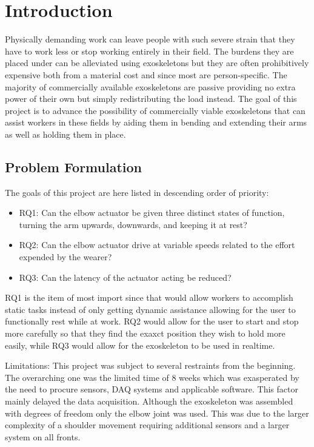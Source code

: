 \section{Introduction}
\label{section:intro}

Physically demanding work can leave people with such severe strain that they have to work less or stop working entirely in 
their field\cite{WorkDemands}. The burdens they are placed under can be alleviated using exoskeletons but they are often 
prohibitively expensive both from a material cost and since most are person-specific. The majority of commercially available 
exoskeletons are passive providing no extra power of their own but simply redistributing the load instead. The goal of this 
project is to advance the possibility of commercially viable exoskeletons that can assist workers in these fields by aiding 
them in bending and extending their arms as well as holding them in place.

\subsection{Problem Formulation}
The goals of this project are here listed in descending order of priority:
\begin{itemize}
        
    \item RQ1: Can the elbow actuator be given three distinct states of function, turning the arm upwards, downwards, and keeping it at rest?

    \item RQ2: Can the elbow actuator drive at variable speeds related to the effort expended by the wearer?

    \item RQ3: Can the latency of the actuator acting be reduced?

\end{itemize}
RQ1 is the item of most import since that would allow workers to accomplish static tasks instead of only getting dynamic assistance 
allowing for the user to functionally rest while at work. RQ2 would allow for the user to start and stop more carefully so that they 
find the exaxct position they wish to hold more easily, while RQ3 would allow for the exoskeleton to be used in realtime.

Limitations:
    This project was subject to several restraints from the beginning. The overarching one was the limited time of 8 weeks which was
    exasperated by the need to procure sensors, DAQ systems and applicable software. This factor mainly delayed the data acquisition. 
    Although the exoskeleton was assembled with degrees of freedom only the elbow joint was used. This was due to the larger complexity 
    of a shoulder movement requiring additional sensors and a larger system on all fronts.


